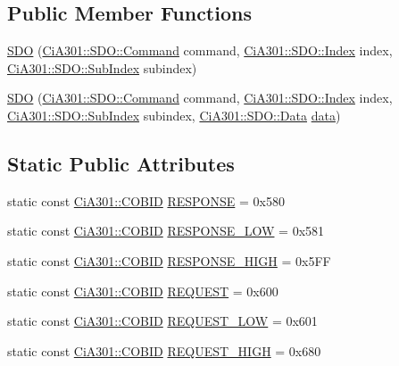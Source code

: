 \subsection*{Public Member Functions}
\begin{DoxyCompactItemize}
\item 
\hyperlink{struct_ci_a301_1_1_s_d_o_a09379dd0f7a4c0b497236700e743de91}{S\+D\+O} (\hyperlink{struct_ci_a301_1_1_s_d_o_a775f3ad0c6ad9894efd23092a37906ea}{Ci\+A301\+::\+S\+D\+O\+::\+Command} command, \hyperlink{struct_ci_a301_1_1_s_d_o_a23ec0bef652b1fad0123ec3bed770852}{Ci\+A301\+::\+S\+D\+O\+::\+Index} index, \hyperlink{struct_ci_a301_1_1_s_d_o_add21496adb09c6f74c8f725c17ec116a}{Ci\+A301\+::\+S\+D\+O\+::\+Sub\+Index} subindex)
\item 
\hyperlink{struct_ci_a301_1_1_s_d_o_a08b5da65e44b07de85a73158e8a52ed6}{S\+D\+O} (\hyperlink{struct_ci_a301_1_1_s_d_o_a775f3ad0c6ad9894efd23092a37906ea}{Ci\+A301\+::\+S\+D\+O\+::\+Command} command, \hyperlink{struct_ci_a301_1_1_s_d_o_a23ec0bef652b1fad0123ec3bed770852}{Ci\+A301\+::\+S\+D\+O\+::\+Index} index, \hyperlink{struct_ci_a301_1_1_s_d_o_add21496adb09c6f74c8f725c17ec116a}{Ci\+A301\+::\+S\+D\+O\+::\+Sub\+Index} subindex, \hyperlink{struct_ci_a301_1_1_s_d_o_a8224c82a3130510d9cdb8ae739de624b}{Ci\+A301\+::\+S\+D\+O\+::\+Data} \hyperlink{struct_ci_a301_1_1_object_a73870d74c7ffaaf07515bf4a5d5330ea}{data})
\end{DoxyCompactItemize}
\subsection*{Static Public Attributes}
\begin{DoxyCompactItemize}
\item 
static const \hyperlink{namespace_ci_a301_aec5b5dbb2b60d2837c60499f6f297aa7}{Ci\+A301\+::\+C\+O\+B\+I\+D} \hyperlink{struct_ci_a301_1_1_s_d_o_a07a9b6fd21e38720d34acd0ad570f405}{R\+E\+S\+P\+O\+N\+S\+E} = 0x580
\item 
static const \hyperlink{namespace_ci_a301_aec5b5dbb2b60d2837c60499f6f297aa7}{Ci\+A301\+::\+C\+O\+B\+I\+D} \hyperlink{struct_ci_a301_1_1_s_d_o_a4d1cfd74034335f16b43a11f8e804029}{R\+E\+S\+P\+O\+N\+S\+E\+\_\+\+L\+O\+W} = 0x581
\item 
static const \hyperlink{namespace_ci_a301_aec5b5dbb2b60d2837c60499f6f297aa7}{Ci\+A301\+::\+C\+O\+B\+I\+D} \hyperlink{struct_ci_a301_1_1_s_d_o_aef5fb9c8aa9d87537b049f57fe4bcd53}{R\+E\+S\+P\+O\+N\+S\+E\+\_\+\+H\+I\+G\+H} = 0x5\+F\+F
\item 
static const \hyperlink{namespace_ci_a301_aec5b5dbb2b60d2837c60499f6f297aa7}{Ci\+A301\+::\+C\+O\+B\+I\+D} \hyperlink{struct_ci_a301_1_1_s_d_o_afffb267d48f6130ca06a8ad461d52e4f}{R\+E\+Q\+U\+E\+S\+T} = 0x600
\item 
static const \hyperlink{namespace_ci_a301_aec5b5dbb2b60d2837c60499f6f297aa7}{Ci\+A301\+::\+C\+O\+B\+I\+D} \hyperlink{struct_ci_a301_1_1_s_d_o_ab64717b4ca5b6da42af0599ef2ce4b8e}{R\+E\+Q\+U\+E\+S\+T\+\_\+\+L\+O\+W} = 0x601
\item 
static const \hyperlink{namespace_ci_a301_aec5b5dbb2b60d2837c60499f6f297aa7}{Ci\+A301\+::\+C\+O\+B\+I\+D} \hyperlink{struct_ci_a301_1_1_s_d_o_a80d1d78a40a173a165cb66b9101d25f1}{R\+E\+Q\+U\+E\+S\+T\+\_\+\+H\+I\+G\+H} = 0x680
\end{DoxyCompactItemize}
